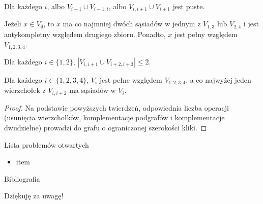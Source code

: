 \documentclass[polish]{beamer}
\begin{document}
\begin{frame}
    \begin{theorem}
        \renewcommand{\qedsymbol}{}
        Dla każdego $i$, albo $V_{i-1} \cup V_{i-1,i}$, albo $V_{i,i+1} \cup V_{i+1}$ jest puste.
    \end{theorem}
    \graphSmaller
\end{frame}

\begin{frame}
    \begin{theorem}
        \renewcommand{\qedsymbol}{}
        Jeżeli $x \in V_\emptyset$, to $x$ ma co najmniej dwóch sąsiadów w jednym z $V_{1,3}$ lub $V_{2,4}$ i jest antykompletny względem drugiego zbioru. Ponadto, $x$ jest pełny względem $V_{1,2,3,4}$.
    \end{theorem}
    \graphSmaller
\end{frame}

\begin{frame}
    \begin{theorem}
        \renewcommand{\qedsymbol}{}
        Dla każdego $i \in \{1, 2\}$, $|V_{i,i+1} \cup V_{i+2,i+3}| \leq 2$.
    \end{theorem}
    \graphSmaller
\end{frame}

\begin{frame}
    \begin{theorem}
        \renewcommand{\qedsymbol}{}
        Dla każdego $i \in \{1, 2, 3, 4\}$, $V_i$ jest pełne względem $V_{1,2,3,4}$, a co najwyżej jeden wierzchołek z $V_{i,i+2}$ ma sąsiadów w $V_i$.
    \end{theorem}
    \graphSmaller
\end{frame}

\begin{frame}
    \begin{proof}     
        Na podstawie powyższych twierdzeń, odpowiednia liczba operacji (usunięcia wierzchołków, komplementacje podgrafów i komplementacje dwudzielne) prowadzi do grafu o ograniczonej szerokości kliki.
        \end{proof}
\end{frame}

\begin{frame}{Lista problemów otwartych}
    \begin{itemize}
        \item item
    \end{itemize}
\end{frame}

\nocite{c_a_r_orig, c_s_r, b_s_p, h_p_a}
\begin{frame}[allowframebreaks]{Bibliografia}
    
    
\end{frame}

\begin{frame}
    \begin{center}
        {\huge Dziękuję za uwagę!}
    \end{center}
\end{frame}

\end{document}
